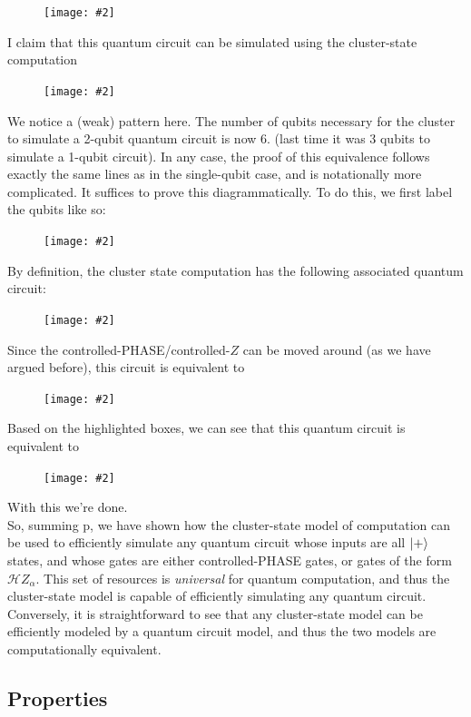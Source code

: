 \documentclass{book}
\theoremstyle{definition}
\newcommand{\had}{\mathcal{H}}
\newcommand{\al}{\alpha}
\newcommand{\fig}[2]{
	\begin{figure}[!htb]
		\centering
		\texttt{[image: \#2]}
	\end{figure}}
\begin{document}
\fig{0.55}{cluster7}

I claim that this quantum circuit can be simulated using the cluster-state computation

\fig{0.45}{cluster2}

We notice a (weak) pattern here. The number of qubits necessary for the cluster to simulate a 2-qubit quantum circuit is now 6. (last time it was 3 qubits to simulate a 1-qubit circuit). In any case, the proof of this equivalence follows exactly the same lines as in the single-qubit case, and is notationally more complicated. It suffices to prove this diagrammatically. To do this, we first label the qubits like so:

\fig{0.35}{cluster8}

By definition, the cluster state computation has the following associated quantum circuit:

\fig{0.35}{cluster9}

Since the controlled-PHASE/controlled-$Z$ can be moved around (as we have argued before), this circuit is equivalent to

\fig{0.35}{cluster10}

Based on the highlighted boxes, we can see that this quantum circuit is equivalent to 

\fig{0.35}{cluster11}

With this we're done. \\

So, summing p, we have shown how the cluster-state model of computation can be used to efficiently simulate any quantum circuit whose inputs are all $\ket{+}$ states, and whose gates are either controlled-PHASE gates, or gates of the form $\had Z_\al$. This set of resources is \textit{universal} for quantum computation, and thus the cluster-state model is capable of efficiently simulating any quantum circuit. \\

Conversely, it is straightforward to see that any cluster-state model can be efficiently modeled by a quantum circuit model, and thus the two models are computationally equivalent. 













\subsection{Properties}
\end{document}
